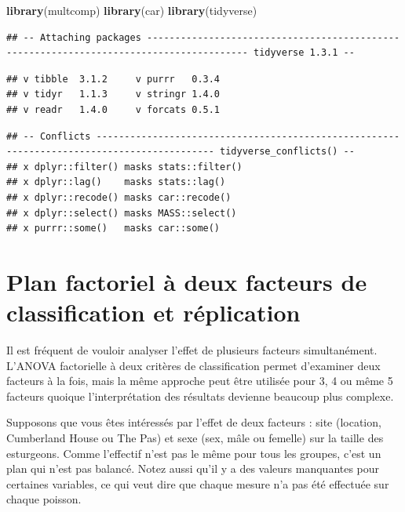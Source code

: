 \documentclass[
  12pt,
]{book}
\newenvironment{Shaded}{\begin{snugshade}}{\end{snugshade}}
\newcommand{\KeywordTok}[1]{\textcolor[rgb]{0.13,0.29,0.53}{\textbf{#1}}}
\newcommand{\NormalTok}[1]{#1}
\begin{document}
\begin{Shaded}
\begin{Highlighting}[]
\KeywordTok{library}\NormalTok{(multcomp)}
\KeywordTok{library}\NormalTok{(car)}
\KeywordTok{library}\NormalTok{(tidyverse)}
\end{Highlighting}
\end{Shaded}

\begin{verbatim}
## -- Attaching packages ---------------------------------------------------------------------------------------- tidyverse 1.3.1 --
\end{verbatim}

\begin{verbatim}
## v tibble  3.1.2     v purrr   0.3.4
## v tidyr   1.1.3     v stringr 1.4.0
## v readr   1.4.0     v forcats 0.5.1
\end{verbatim}

\begin{verbatim}
## -- Conflicts ------------------------------------------------------------------------------------------- tidyverse_conflicts() --
## x dplyr::filter() masks stats::filter()
## x dplyr::lag()    masks stats::lag()
## x dplyr::recode() masks car::recode()
## x dplyr::select() masks MASS::select()
## x purrr::some()   masks car::some()
\end{verbatim}

\hypertarget{plan-factoriel-uxe0-deux-facteurs-de-classification-et-ruxe9plication}{%
\section{Plan factoriel à deux facteurs de classification et réplication}\label{plan-factoriel-uxe0-deux-facteurs-de-classification-et-ruxe9plication}}

Il est fréquent de vouloir analyser l'effet de plusieurs facteurs simultanément. L'ANOVA factorielle à deux critères de classification permet d'examiner deux facteurs à la fois, mais la même approche peut être utilisée pour 3, 4 ou même 5 facteurs quoique l'interprétation des résultats devienne beaucoup plus complexe.

Supposons que vous êtes intéressés par l'effet de deux facteurs : site (location, Cumberland House ou The Pas) et sexe (sex, mâle ou femelle) sur la taille des esturgeons. Comme l'effectif n'est pas le même pour tous les groupes, c'est un plan qui n'est pas balancé. Notez aussi qu'il y a des valeurs manquantes pour certaines variables, ce qui veut dire que chaque mesure n'a pas été effectuée sur chaque poisson.
\end{document}
